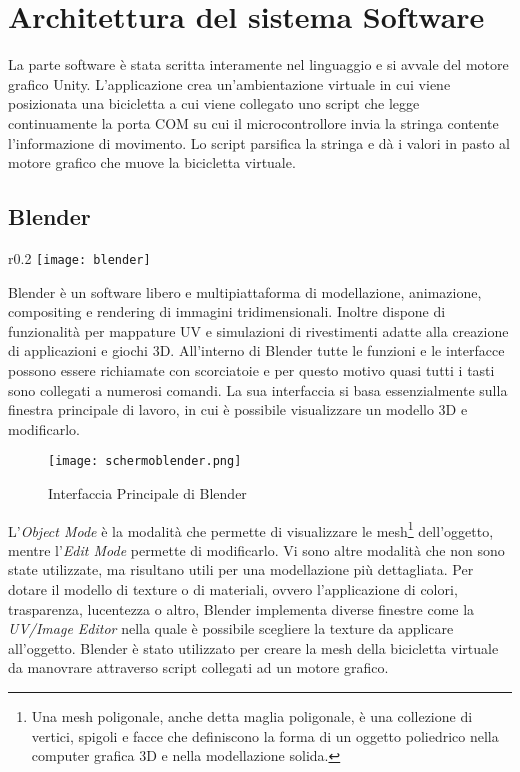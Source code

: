 \chapter{Architettura del sistema Software}
\label{software}
\thispagestyle{empty}

\label{software}
La parte software è stata scritta interamente nel linguaggio \Csharp\: e si avvale del motore grafico Unity. L'applicazione crea un'ambientazione virtuale in cui viene posizionata una bicicletta a cui viene collegato uno script che legge continuamente la porta COM su cui il microcontrollore invia la stringa contente l'informazione di movimento. Lo script parsifica la stringa e dà i valori in pasto al motore grafico che muove la bicicletta virtuale.
\section{Blender}
\begin{wrapfigure}{r}{0.2\textwidth} %
    \centering
    \vspace{-1.0cm}
    \texttt{[image: blender]}
\end{wrapfigure}
Blender è un software libero e multipiattaforma di modellazione, animazione, compositing e rendering di immagini tridimensionali. Inoltre dispone di funzionalità per mappature UV e simulazioni di rivestimenti adatte alla creazione di applicazioni e giochi 3D. All'interno di Blender tutte le funzioni e le interfacce possono essere richiamate con scorciatoie e per questo motivo quasi tutti i tasti sono collegati a numerosi comandi. La sua interfaccia si basa essenzialmente sulla finestra principale di lavoro, in cui è possibile visualizzare un modello 3D e modificarlo. 
\begin{figure}[hbt]
\centering
  \texttt{[image: schermoblender.png]}
  \caption{Interfaccia Principale di Blender}
\end{figure}

\noindent L'\textit{Object Mode} è la modalità che permette di visualizzare le mesh\footnote{Una mesh poligonale, anche detta maglia poligonale, è una collezione di vertici, spigoli e facce che definiscono la forma di un oggetto poliedrico nella computer grafica 3D e nella modellazione solida.} dell'oggetto, mentre l'\textit{Edit Mode} permette di modificarlo. Vi sono altre modalità che non sono state utilizzate, ma risultano utili per una modellazione più dettagliata. Per dotare il modello di texture o di materiali, ovvero l'applicazione di colori, trasparenza, lucentezza o altro, Blender implementa diverse finestre come la \textit{UV/Image Editor} nella quale è possibile scegliere la texture da applicare all'oggetto. Blender è stato utilizzato per creare la mesh della bicicletta virtuale da manovrare attraverso script collegati ad un motore grafico.
